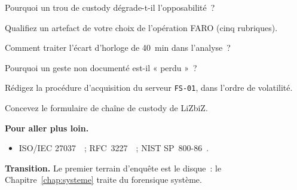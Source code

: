 \begin{boxexo}[title={\ding{45}\quad Exercice~11.5. CRO \niveaumoyen}]
Pourquoi un trou de custody dégrade-t-il l'opposabilité~?
\end{boxexo}

\begin{boxexo}[title={\ding{45}\quad Exercice~11.6. Artefact \niveaumoyen}]
Qualifiez un artefact de votre choix de l'opération FARO (cinq rubriques).
\end{boxexo}

\begin{boxexo}[title={\ding{45}\quad Exercice~11.7. Horloge \niveaumoyen}]
Comment traiter l'écart d'horloge de 40~min dans l'analyse~?
\end{boxexo}

\begin{boxexo}[title={\ding{45}\quad Exercice~11.8. Documentation \niveaumoyen}]
Pourquoi un geste non documenté est-il « perdu »~?
\end{boxexo}

\begin{boxexo}[title={\ding{45}\quad Exercice~11.9. Procédure d'acquisition \niveauexpert}]
Rédigez la procédure d'acquisition du serveur \texttt{FS-01}, dans l'ordre de
volatilité.
\end{boxexo}

\begin{boxexo}[title={\ding{45}\quad Exercice~11.10. Formulaire de custody \niveauexpert}]
Concevez le formulaire de chaîne de custody de LiZbiZ.
\end{boxexo}

\bigskip

\begin{boxinfo}
\textbf{Pour aller plus loin.}
\begin{itemize}
    \item ISO/IEC 27037~\cite{iso27037}~; RFC~3227~\cite{rfc3227}~;
          NIST SP~800-86~\cite{nist80086}.
\end{itemize}
\end{boxinfo}

\begin{boxinfo}
\textbf{Transition.} Le premier terrain d'enquête est le disque~: le
Chapitre~\ref{chap:systeme} traite du forensique système.
\end{boxinfo}
